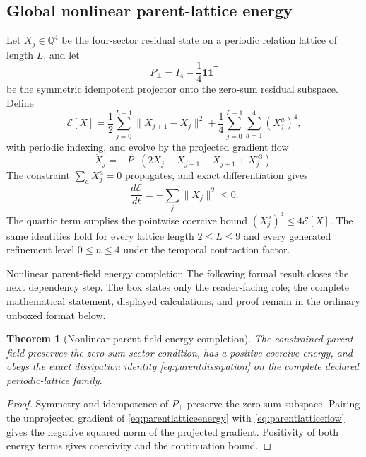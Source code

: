 \documentclass[11pt]{article}
\numberwithin{equation}{section}
\newtheorem{theorem}[definition]{Theorem}
\theoremstyle{remark}
\newcommand{\Q}{\mathbb{Q}}
\begin{document}
\subsection{Global nonlinear parent-lattice energy}
Let $X_j\in\Q^4$ be the four-sector residual state on a periodic relation lattice of length $L$, and let
\begin{equation}
P_{\perp}=I_4-\frac14\mathbf 1\mathbf 1^{\mathsf T}
\end{equation}
be the symmetric idempotent projector onto the zero-sum residual subspace. Define
\begin{equation}
\mathcal E[X]
=\frac12\sum_{j=0}^{L-1}\lVert X_{j+1}-X_j\rVert^2
+\frac14\sum_{j=0}^{L-1}\sum_{a=1}^{4}(X_j^a)^4,
\label{eq:parentlatticeenergy}
\end{equation}
with periodic indexing, and evolve by the projected gradient flow
\begin{equation}
\dot X_j=-P_{\perp}\left(2X_j-X_{j-1}-X_{j+1}+X_j^{\circ3}\right).
\label{eq:parentlatticeflow}
\end{equation}
The constraint $\sum_aX_j^a=0$ propagates, and exact differentiation gives
\begin{equation}
\frac{d\mathcal E}{dt}=-\sum_j\lVert\dot X_j\rVert^2\le0.
\label{eq:parentdissipation}
\end{equation}
The quartic term supplies the pointwise coercive bound $(X_j^a)^4\le4\mathcal E[X]$. The same identities hold for every lattice length $2\le L\le9$ and every generated refinement level $0\le n\le4$ under the temporal contraction factor.

\begin{proofguide}{Nonlinear parent-field energy completion}
The following formal result closes the next dependency step. The box states only the reader-facing role; the complete mathematical statement, displayed calculations, and proof remain in the ordinary unboxed format below.
\end{proofguide}
\begin{theorem}[Nonlinear parent-field energy completion]
The constrained parent field preserves the zero-sum sector condition, has a positive coercive energy, and obeys the exact dissipation identity \eqref{eq:parentdissipation} on the complete declared periodic-lattice family.
\end{theorem}
\begin{proof}
Symmetry and idempotence of $P_{\perp}$ preserve the zero-sum subspace. Pairing the unprojected gradient of \eqref{eq:parentlatticeenergy} with \eqref{eq:parentlatticeflow} gives the negative squared norm of the projected gradient. Positivity of both energy terms gives coercivity and the continuation bound.
\end{proof}
\end{document}
